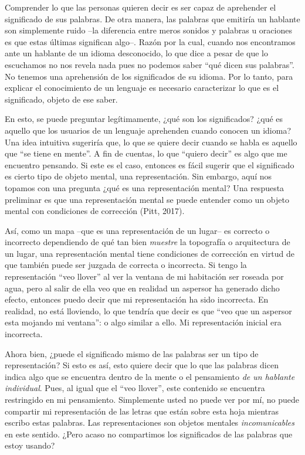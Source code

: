 \documentclass[]{book}
\begin{document}
\begin{refsection}
Comprender lo que las personas quieren decir es ser capaz de aprehender
el significado de sus palabras. De otra manera, las palabras que
emitiría un hablante son simplemente ruido --la diferencia entre meros
sonidos y palabras u oraciones es que estas últimas significan algo--.
Razón por la cual, cuando nos encontramos ante un hablante de un idioma
desconocido, lo que dice a pesar de que lo escuchamos no nos revela nada
pues no podemos saber ``qué dicen sus palabras''. No tenemos una
aprehensión de los significados de su idioma. Por lo tanto, para
explicar el conocimiento de un lenguaje es necesario caracterizar lo que
es el significado, objeto de ese saber.

En esto, se puede preguntar legítimamente, ¿qué son los significados?
¿qué es aquello que los usuarios de un lenguaje aprehenden cuando
conocen un idioma? Una idea intuitiva sugeriría que, lo que se quiere
decir cuando se habla es aquello que ``se tiene en mente''. A fin de
cuentas, lo que ``quiero decir'' es algo que me encuentro pensando. Si
este es el caso, entonces es fácil sugerir que el significado es cierto
tipo de objeto mental, una representación. Sin embargo, aquí nos topamos
con una pregunta ¿qué es una representación mental? Una respuesta
preliminar es que una representación mental se puede entender como un
objeto mental con condiciones de corrección (Pitt, 2017).

Así, como un mapa --que es una representación de un lugar-- es correcto
o incorrecto dependiendo de qué tan bien \emph{muestre} la topografía o
arquitectura de un lugar, una representación mental tiene condiciones de
corrección en virtud de que también puede ser juzgada de correcta o
incorrecta. Si tengo la representación ``veo llover'' al ver la ventana
de mi habitación ser roseada por agua, pero al salir de ella veo que en
realidad un aspersor ha generado dicho efecto, entonces puedo decir que
mi representación ha sido incorrecta. En realidad, no está lloviendo, lo
que tendría que decir es que ``veo que un aspersor esta mojando mi
ventana'': o algo similar a ello. Mi representación inicial era
incorrecta.

Ahora bien, ¿puede el significado mismo de las palabras ser un tipo de
representación? Si esto es así, esto quiere decir que lo que las
palabras dicen indica algo que se encuentra dentro de la mente o el
pensamiento \emph{de un hablante individual}. Pues, al igual que el
``veo llover'', este contenido se encuentra restringido en mi
pensamiento. Simplemente usted no puede ver por mí, no puede compartir
mi representación de las letras que están sobre esta hoja mientras
escribo estas palabras. Las representaciones son objetos mentales
\emph{incomunicables} en este sentido. ¿Pero acaso no compartimos los
significados de las palabras que estoy usando?


\end{refsection}
\end{document}
